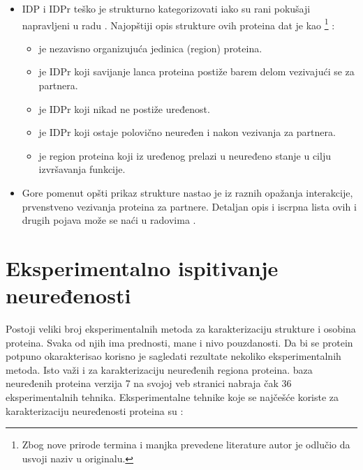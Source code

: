 \begin{itemize}
  \item 
    IDP i IDPr teško je strukturno kategorizovati \parencite{oldfield2014,
      dunker2001} iako su rani pokušaji napravljeni u radu \parencite{dunker2001}.
      Najopštiji opis strukture ovih proteina dat je kao
      \footnote{ Zbog nove
        prirode termina i manjka prevedene literature autor je odlučio da
      usvoji naziv u originalu.} \parencite{uversky2016}:
    \begin{itemize}
      \item {}  je nezavisno organizujuća jedinica (region) proteina.
      \item {}  je IDPr koji savijanje lanca proteina postiže barem delom vezivajući se za partnera. 
      \item {}  je IDPr koji nikad ne postiže uređenost.
      \item {}  je IDPr koji ostaje polovično neuređen i nakon vezivanja za partnera.
      \item {}  je region proteina koji iz uređenog prelazi u neuređeno stanje u cilju izvršavanja funkcije.
    \end{itemize}

  \item 
    Gore pomenut opšti prikaz strukture nastao je iz raznih opažanja
    interakcije, prvenstveno vezivanja proteina za partnere.
    Detaljan opis i iscrpna lista ovih i drugih pojava može se naći u radovima
    \cite{uversky2016, a2z,  Tompa2009}.

\end{itemize}

\section{Eksperimentalno ispitivanje neuređenosti}

Postoji veliki broj eksperimentalnih metoda za karakterizaciju strukture i
osobina proteina.  Svaka od njih ima prednosti, mane i nivo pouzdanosti. Da bi
se protein potpuno okarakterisao korisno je sagledati rezultate nekoliko
eksperimentalnih metoda. Isto važi i za karakterizaciju neuređenih regiona
proteina. \textit{} \cite{Piovesan2016} baza neuređenih
proteina verzija 7 na svojoj veb stranici nabraja čak 36 eksperimentalnih
tehnika.  Eksperimentalne tehnike koje se najčešće koriste za karakterizaciju
neuređenosti proteina su \cite{dunker2001}: 

